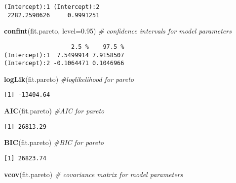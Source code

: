 \documentclass[]{book}
\newenvironment{Shaded}{\begin{snugshade}}{\end{snugshade}}
\newcommand{\KeywordTok}[1]{\textcolor[rgb]{0.13,0.29,0.53}{\textbf{#1}}}
\newcommand{\DataTypeTok}[1]{\textcolor[rgb]{0.13,0.29,0.53}{#1}}
\newcommand{\FloatTok}[1]{\textcolor[rgb]{0.00,0.00,0.81}{#1}}
\newcommand{\CommentTok}[1]{\textcolor[rgb]{0.56,0.35,0.01}{\textit{#1}}}
\newcommand{\NormalTok}[1]{#1}
\theoremstyle{definition}
\theoremstyle{definition}
\theoremstyle{definition}
\theoremstyle{remark}
\begin{document}
\begin{verbatim}
(Intercept):1 (Intercept):2 
 2282.2590626     0.9991251 
\end{verbatim}

\begin{Shaded}
\begin{Highlighting}[]
\KeywordTok{confint}\NormalTok{(fit.pareto, }\DataTypeTok{level=}\FloatTok{0.95}\NormalTok{)  }\CommentTok{# confidence intervals for model parameters }
\end{Highlighting}
\end{Shaded}

\begin{verbatim}
                   2.5 %    97.5 %
(Intercept):1  7.5499914 7.9158507
(Intercept):2 -0.1064471 0.1046966
\end{verbatim}

\begin{Shaded}
\begin{Highlighting}[]
\KeywordTok{logLik}\NormalTok{(fit.pareto)               }\CommentTok{#loglikelihood for pareto}
\end{Highlighting}
\end{Shaded}

\begin{verbatim}
[1] -13404.64
\end{verbatim}

\begin{Shaded}
\begin{Highlighting}[]
\KeywordTok{AIC}\NormalTok{(fit.pareto)                  }\CommentTok{#AIC for pareto}
\end{Highlighting}
\end{Shaded}

\begin{verbatim}
[1] 26813.29
\end{verbatim}

\begin{Shaded}
\begin{Highlighting}[]
\KeywordTok{BIC}\NormalTok{(fit.pareto)                  }\CommentTok{#BIC for pareto}
\end{Highlighting}
\end{Shaded}

\begin{verbatim}
[1] 26823.74
\end{verbatim}

\begin{Shaded}
\begin{Highlighting}[]
\KeywordTok{vcov}\NormalTok{(fit.pareto)                 }\CommentTok{# covariance matrix for model parameters }
\end{Highlighting}
\end{Shaded}
\end{document}
